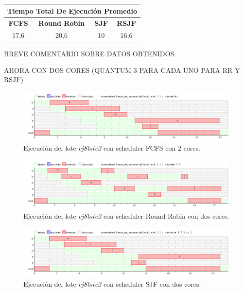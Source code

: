 \begin{center}
	\begin{tabular}{|c|c|c|c|}
		\hline
		\multicolumn{4}{|c|}{\large{\textbf{Tiempo Total De Ejecución Promedio}}} \\
		\hline
		\textbf{FCFS} & \textbf{Round Robin} & \textbf{SJF} & \textbf{RSJF} \\
		\hline
		17,6 & 20,6 & 10 & 16,6 \\
		\hline
	\end{tabular}
\end{center}

BREVE COMENTARIO SOBRE DATOS OBTENIDOS

AHORA CON DOS CORES (QUANTUM 3 PARA CADA UNO PARA RR Y RSJF)

\begin{figure}[!h]
	\begin{center}
		\includegraphics[width=500px]{imagenes/ej8_prueba2_fcfs2.png}
		\caption{Ejecución del lote \emph{ej8lote2} con scheduler FCFS con 2 cores.}
		\label{fig:grafico_ej8_prueba2_fcfs2}
	\end{center}
\end{figure}

\begin{figure}[!h]
	\begin{center}
		\includegraphics[width=500px]{imagenes/ej8_prueba2_rr2.png}
		\caption{Ejecución del lote \emph{ej8lote2} con scheduler Round Robin con dos cores.}
		\label{fig:grafico_ej8_prueba2_rr2}
	\end{center}
\end{figure}

\newpage

\begin{figure}[!h]
	\begin{center}
		\includegraphics[width=500px]{imagenes/ej8_prueba2_sjf2.png}
		\caption{Ejecución del lote \emph{ej8lote2} con scheduler SJF con dos cores.}
		\label{fig:grafico_ej8_prueba2_sjf2}
	\end{center}
\end{figure}

